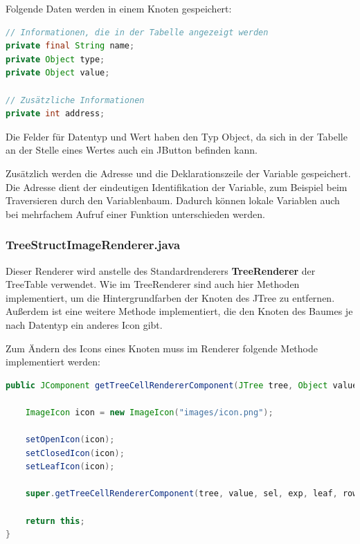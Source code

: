 Folgende Daten werden in einem Knoten gespeichert:
\begin{lstlisting}[language=JAVA]
// Informationen, die in der Tabelle angezeigt werden
private final String name;
private Object type;
private Object value;

// Zusätzliche Informationen
private int address;
\end{lstlisting}
Die Felder für Datentyp und Wert haben den Typ Object, da sich in der Tabelle an der Stelle eines Wertes auch ein JButton befinden kann.

Zusätzlich werden die Adresse und die Deklarationszeile der Variable gespeichert. Die Adresse dient der eindeutigen Identifikation der Variable, zum Beispiel beim Traversieren durch den Variablenbaum. Dadurch können lokale Variablen auch bei mehrfachem Aufruf einer Funktion unterschieden werden.

\subsubsection*{TreeStructImageRenderer.java}
Dieser Renderer wird anstelle des Standardrenderers \textbf{TreeRenderer} der TreeTable verwendet. Wie im TreeRenderer sind auch hier Methoden implementiert, um die Hintergrundfarben der Knoten des JTree zu entfernen. Außerdem ist eine weitere Methode implementiert, die den Knoten des Baumes je nach Datentyp ein anderes Icon gibt.

Zum Ändern des Icons eines Knoten muss im Renderer folgende Methode implementiert werden:
\begin{lstlisting}[language=JAVA]
public JComponent getTreeCellRendererComponent(JTree tree, Object value, boolean sel, boolean exp, boolean leaf, int row, boolean hasFocus) {

	ImageIcon icon = new ImageIcon("images/icon.png");

	setOpenIcon(icon);
	setClosedIcon(icon);
	setLeafIcon(icon);
	
	super.getTreeCellRendererComponent(tree, value, sel, exp, leaf, row, hasFocus);
		
	return this;
}
\end{lstlisting}

